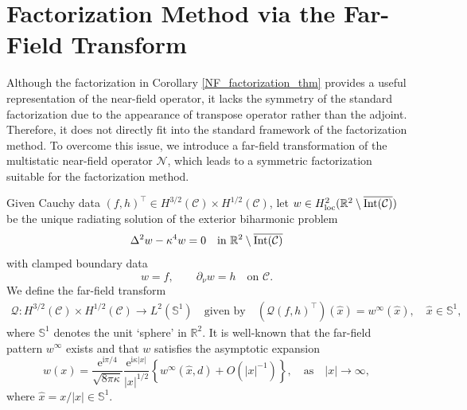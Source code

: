 \documentclass{article}
\begin{document}
\section{Factorization Method via the Far-Field Transform} \label{transform_sect}
Although the factorization in Corollary \ref{NF_factorization_thm} provides a useful representation of the near-field operator, it lacks the symmetry of the standard factorization due to the appearance of transpose operator rather than the adjoint. Therefore, it does not directly fit into the standard
framework of the factorization method. To overcome this issue, we
introduce a far-field transformation of the multistatic near-field
operator $\mathcal N$, which leads to a symmetric factorization suitable
for the factorization method.

Given Cauchy data $(f,h)^\top\in H^{3/2}(\mathcal C)\times H^{1/2}(\mathcal C)$,
let $w\in H^2_{\mathrm{loc}}(\mathbb R^2\setminus \overline{\rm{Int}(\mathcal C)})$ be the unique radiating solution of the exterior biharmonic problem
\begin{equation}
\Delta^2 w - \kappa^4 w = 0 \quad \text{in } \mathbb R^2\setminus \overline{\rm{Int}(\mathcal C)}
\end{equation}
with clamped boundary data
\begin{equation}
w= f,\qquad \partial_{\nu} w = h \quad \text{on } \mathcal C.
\end{equation}
We define the far-field transform
\begin{align}\label{FF_transform}
\mathcal Q: H^{3/2}(\mathcal C)\times H^{1/2}(\mathcal C) \to L^2(\mathbb{S}^1) \quad \text{given by} \quad (\mathcal Q (f,h)^{\top})(\hat x)
= w^{\infty}(\hat x),\quad \hat x\in\mathbb S^1,
\end{align}
where $\mathbb S^1$ denotes the unit `sphere' in $\mathbb R^2$. It is well-known that the far-field pattern $w^\infty$ exists and that $w$ satisfies the asymptotic expansion 
\[
w(x)=\frac{\mathrm e^{\mathrm i\pi/4}}{\sqrt{8\pi \kappa}}\frac{\mathrm e^{\mathrm i\kappa |x|}}{|x|^{1/2}}\left\{w^{\infty}(\hat x,d)+O(|x|^{-1})\right\},\quad \text{as}\quad |x|\to\infty,
\]
where $\hat x=x/|x|\in \mathbb S^1$. 
\end{document}
